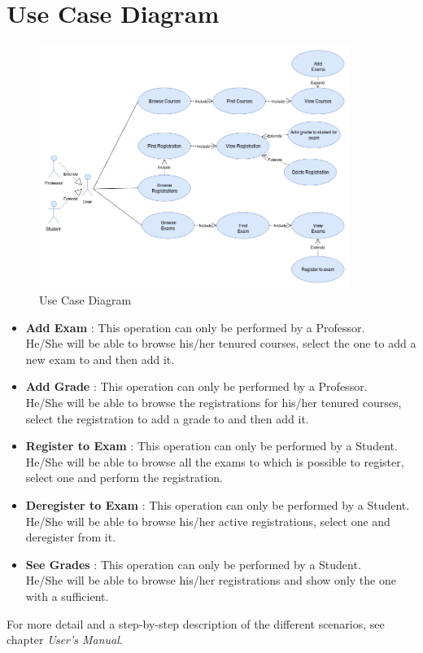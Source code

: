 \documentclass{report}
\begin{document}
\section*{Use Case Diagram}
\begin{figure}[ht]
	\includegraphics[width=0.9\textwidth]{UseCaseDiagram.png}
	\caption{Use Case Diagram}
\end{figure}

\begin{itemize}
	\item \textbf{Add Exam} : This operation can only be performed by a Professor.\\ He/She will be able to browse his/her tenured courses, select the one to add a new exam to and then add it.
	\item \textbf{Add Grade} : This operation can only be performed by a Professor.\\ He/She will be able to browse the registrations for his/her tenured courses, select the registration to add a grade to and then add it.
	\item \textbf{Register to Exam} : This operation can only be performed by a Student.\\ He/She will be able to browse all the exams to which is possible to register, select one and perform the registration.
	\item \textbf{Deregister to Exam} : This operation can only be performed by a Student.\\ He/She will be able to browse his/her active registrations, select one and deregister from it.
	\item \textbf{See Grades} : This operation can only be performed by a Student.\\ He/She will be able to browse his/her registrations and show only the one with a sufficient.
\end{itemize}
For more detail and a step-by-step description of the different scenarios, see chapter \textit{User's Manual}.
\newpage
\end{document}
